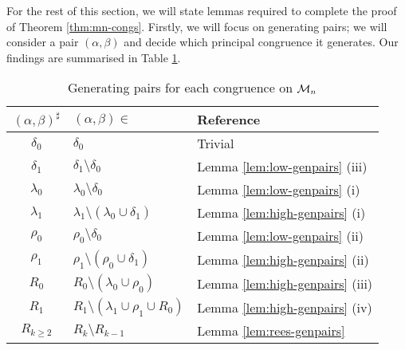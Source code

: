 For the rest of this section, we will state lemmas required to complete the
proof of Theorem \ref{thm:mn-congs}.  Firstly, we will focus on generating
pairs; we will consider a pair $(\alpha, \beta)$ and decide which principal
congruence it generates.  Our findings are summarised in Table
\ref{tab:mn-genpairs}.

\begin{table}[h]
  \renewcommand\arraystretch{1.0}
  \centering
  \begin{tabular}{| c | l | l |}
    \hline
    $(\alpha,\beta)^\sharp$ & $(\alpha,\beta) \in$ & Reference \\
    \hline
    $\delta_0$   & $\delta_0$
                 & Trivial                             \\
    $\delta_1$   & $\delta_1 \setminus \delta_0$
                 & Lemma \ref{lem:low-genpairs} (iii)  \\
    $\lambda_0$  & $\lambda_0 \setminus \delta_0$
                 & Lemma \ref{lem:low-genpairs} (i)    \\
    $\lambda_1$  & $\lambda_1 \setminus (\lambda_0 \cup \delta_1)$
                 & Lemma \ref{lem:high-genpairs} (i)   \\
    $\rho_0$     & $\rho_0 \setminus \delta_0$
                 & Lemma \ref{lem:low-genpairs} (ii)   \\
    $\rho_1$     & $\rho_1 \setminus (\rho_0 \cup \delta_1)$
                 & Lemma \ref{lem:high-genpairs} (ii)  \\
    $R_0$        & $R_0 \setminus (\lambda_0 \cup \rho_0)$
                 & Lemma \ref{lem:high-genpairs} (iii) \\
    $R_1$        & $R_1 \setminus (\lambda_1 \cup \rho_1 \cup R_0)$
                 & Lemma \ref{lem:high-genpairs} (iv)  \\
    $R_{k \geq 2}$ & $R_k \setminus R_{k-1}$
                 & Lemma \ref{lem:rees-genpairs}       \\
    \hline
  \end{tabular}
  \caption{Generating pairs for each congruence on $\mathcal{M}_n$}
  \label{tab:mn-genpairs}
\end{table}

